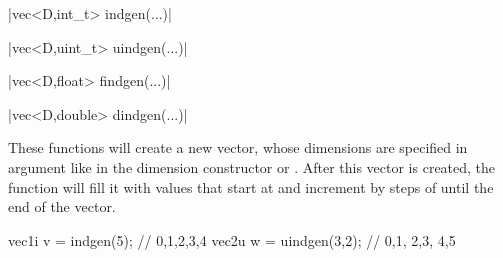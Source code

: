 \funcitem \cppinline|vec<D,int_t>  indgen(...)| 

\cppinline|vec<D,uint_t> uindgen(...)| 

\cppinline|vec<D,float>  findgen(...)| 

\cppinline|vec<D,double> dindgen(...)| 

These functions will create a new vector, whose dimensions are specified in argument like in the dimension constructor  or  . After this vector is created, the function will fill it with values that start at  and increment by steps of  until the end of the vector.

\begin{example}
\begin{cppcode}
vec1i v = indgen(5);    // {0,1,2,3,4}
vec2u w = uindgen(3,2); // {{0,1}, {2,3}, {4,5}}
\end{cppcode}
\end{example}
